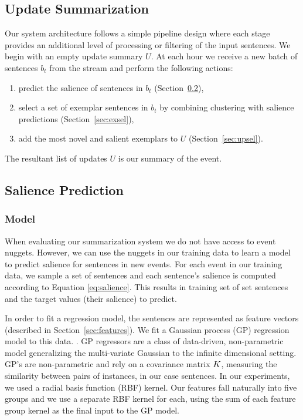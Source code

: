 \subsection{Update Summarization}

Our system architecture follows a simple pipeline design where each
stage provides an additional level of processing or filtering of the input
sentences.
We begin with an empty update summary $U$.
At each hour we receive a new batch of sentences $b_t$ from the stream
and perform the following actions:
\begin{enumerate}
  \item predict the salience of sentences in $b_t$ (Section~\ref{sec:salpred}),
  \item select a set of exemplar sentences in $b_t$ by combining 
      clustering with 
      salience predictions (Section~\ref{sec:exsel}),
  \item add the most novel and salient exemplars 
      to $U$ (Section~\ref{sec:upsel}).
\end{enumerate}
The resultant list of updates $U$ is our summary of the event.


\subsection{Salience Prediction}
\label{sec:salpred}

\subsubsection{Model}

When evaluating our summarization system
we do not have access to event nuggets. However, we can use the nuggets
in our training data to learn a model to predict salience for sentences
in new events.
For each event in our training data, we sample a set of sentences and  each 
sentence's salience is computed according to Equation \ref{eq:salience}.
This results in training set of set sentences and the target values 
(their salience) to predict.

In order to fit a regression model, the sentences are represented as feature
vectors (described in Section~\ref{sec:features}).
We fit a Gaussian process (GP) regression model to this data.
\cite{rasmussen:gaussian-process-book}.  GP regressors are a
class of data-driven, non-parametric model generalizing the multi-variate
Gaussian to the infinite dimensional setting.  
GP's are non-parametric and rely on a covariance matrix $K$, measuring the similarity between pairs of instances, in our 
case sentences.  In our experiments, we used a radial basis 
function (RBF) kernel.  
Our features fall naturally into five groups and we use a separate RBF kernel
for each, using the sum of each feature group kernel as the final input
to the GP model.


